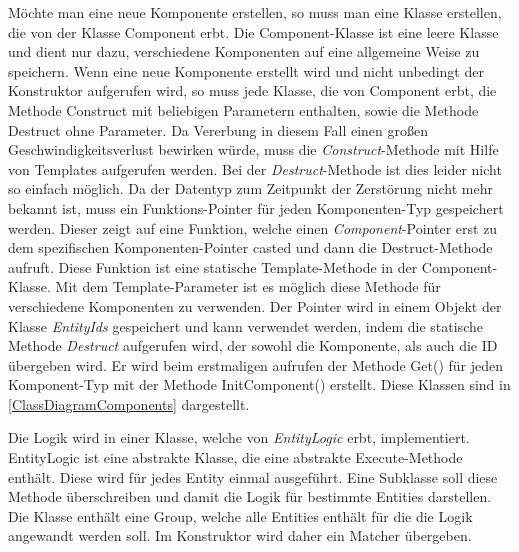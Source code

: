 Möchte man eine neue Komponente erstellen, so muss man eine Klasse erstellen, die von der Klasse Component erbt. Die Component-Klasse ist eine leere Klasse und dient nur dazu, verschiedene Komponenten auf eine allgemeine Weise zu speichern.  %
Wenn eine neue Komponente erstellt wird und nicht unbedingt der Konstruktor aufgerufen wird, so muss jede Klasse, die von Component erbt, die Methode Construct mit beliebigen Parametern enthalten, sowie die Methode Destruct ohne Parameter. %
Da Vererbung in diesem Fall einen großen Geschwindigkeitsverlust bewirken würde, muss die \textit{Construct}-Methode mit Hilfe von Templates aufgerufen werden. Bei der \textit{Destruct}-Methode ist dies leider nicht so einfach möglich. Da der Datentyp zum Zeitpunkt der Zerstörung nicht mehr bekannt ist, muss ein Funktions-Pointer für jeden Komponenten-Typ gespeichert werden. Dieser zeigt auf eine Funktion, welche einen \textit{Component}-Pointer erst zu dem spezifischen Komponenten-Pointer casted und dann die Destruct-Methode aufruft. Diese Funktion ist eine statische Template-Methode in der Component-Klasse. Mit dem Template-Parameter ist es möglich diese Methode für verschiedene Komponenten zu verwenden. Der Pointer wird in einem Objekt der Klasse \textit{EntityIds} gespeichert und kann verwendet werden, indem die statische Methode \textit{Destruct} aufgerufen wird, der sowohl die Komponente, als auch die ID übergeben wird. 
Er wird beim erstmaligen aufrufen der Methode Get() für jeden Komponent-Typ mit der Methode InitComponent() erstellt. Diese Klassen sind in \cref{ClassDiagramComponents} dargestellt.

Die Logik wird in einer Klasse, welche von \textit{EntityLogic} erbt, implementiert. EntityLogic ist eine abstrakte Klasse, die eine abstrakte Execute-Methode enthält. Diese wird für jedes Entity einmal ausgeführt. Eine Subklasse soll diese Methode überschreiben und damit die Logik für bestimmte Entities darstellen. Die Klasse enthält eine Group, welche alle Entities enthält für die die Logik angewandt werden soll. Im Konstruktor wird daher ein Matcher übergeben.